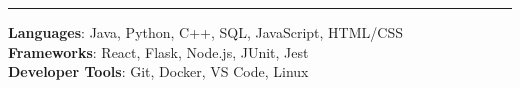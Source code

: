 \documentclass[letterpaper,11pt]{article}
\renewcommand{\section}[1]{\vspace{4pt}{\large\scshape #1}\par\vspace{-3pt}\rule{\textwidth}{0.4pt}\par\vspace{2pt}}
\begin{document}
\section{Technical Skills}
 \begin{list}{}{\setlength{\leftmargin}{0.15in}}
    \small{\item{
     \textbf{Languages}{: Java, Python, C++, SQL, JavaScript, HTML/CSS} \\
     \textbf{Frameworks}{: React, Flask, Node.js, JUnit, Jest} \\
     \textbf{Developer Tools}{: Git, Docker, VS Code, Linux}
    }}
 \end{list}
\end{document}
